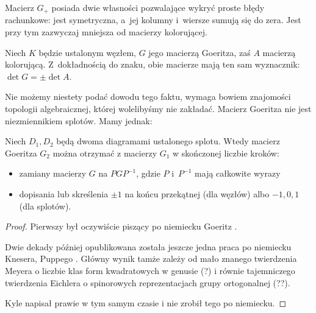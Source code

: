 Macierz $G_+$ posiada dwie własności pozwalające wykryć proste błędy rachunkowe: jest symetryczna, a~jej kolumny i~wiersze sumują się do zera.
Jest przy tym zazwyczaj mniejsza od macierzy kolorującej.

\begin{proposition}
    Niech $K$ będzie ustalonym węzłem, $G$ jego macierzą Goeritza, zaś $A$ macierzą kolorującą.
    Z~dokładnością do znaku, obie macierze mają ten sam wyznacznik: $\det G = \pm \det A$.
\end{proposition}

Nie możemy niestety podać dowodu tego faktu, wymaga bowiem znajomości topologii algebraicznej, której wolelibyśmy nie zakładać.
Macierz Goeritza nie jest niezmiennikiem splotów.
Mamy jednak:

\begin{proposition}
    Niech $D_1, D_2$ będą dwoma diagramami ustalonego splotu.
    Wtedy macierz Goeritza $G_2$ można otrzymać z macierzy $G_1$ w skończonej liczbie kroków:
    \begin{itemize}
        \item zamiany macierzy $G$ na $PGP^{-1}$, gdzie $P$ i~$P^{-1}$ mają całkowite wyrazy
        \item dopisania lub skreślenia $\pm 1$ na końcu przekątnej (dla węzłów) albo $-1, 0, 1$ (dla splotów).
    \end{itemize}
\end{proposition}

\begin{proof}
%
%
%
%
    Pierwszy był oczywiście piszący po niemiecku Goeritz \cite{goeritz33}.

    Dwie dekady później opublikowana została jeszcze jedna praca po niemiecku Knesera, Puppego \cite{kneser53}.
    Główny wynik tamże zależy od mało znanego twierdzenia Meyera o liczbie klas form kwadratowych w genusie (?) i równie tajemniczego twierdzenia Eichlera o spinorowych reprezentacjach grupy ortogonalnej (??).

    Kyle napisał prawie w tym samym czasie \cite{kyle54} i nie zrobił tego po niemiecku.
\end{proof}


